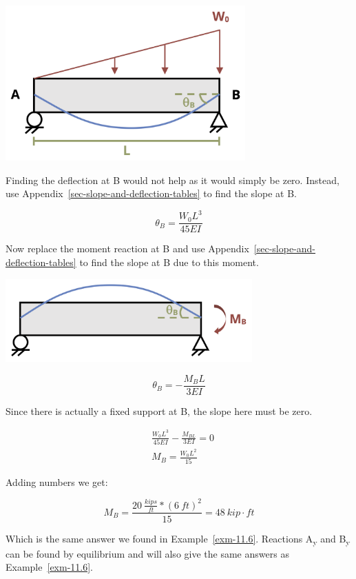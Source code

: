 \documentclass[
  letterpaper,
  DIV=11,
  numbers=noendperiod]{scrreprt}
\theoremstyle{definition}
\theoremstyle{remark}
\begin{document}
\begin{tcolorbox}
\begin{tcolorbox}
\begin{center}
\includegraphics[width=3.625in,height=\textheight]{images/CH11 PNGs/example11.7v2-2.png}
\end{center}

Finding the deflection at B would not help as it would simply be zero.
Instead, use Appendix~\ref{sec-slope-and-deflection-tables} to find the
slope at B.

\[
\theta_B=\frac{W_0 L^3}{45 E I}
\]

Now replace the moment reaction at B and use
Appendix~\ref{sec-slope-and-deflection-tables} to find the slope at B
due to this moment.

\begin{center}
\includegraphics[width=3.72917in,height=\textheight]{images/CH11 PNGs/example11.7v2-3.png}
\end{center}

\[
\theta_B=-\frac{M_B L}{3 E I}
\]

Since there is actually a fixed support at B, the slope here must be
zero.

\[
\begin{aligned} &\frac{W_0 L^3}{45 E I}-\frac{M_{B L}}{3 E I}=0 \\ &M_B  =\frac{W_0 L^2}{15}\end{aligned}
\]

Adding numbers we get:

\[
M_B=\frac{20~\frac{kips}{ft}*(6{~ft})^2}{15}=48{~kip}\cdot{ft}
\]

Which is the same answer we found in Example~\ref{exm-11.6}. Reactions
A\textsubscript{y} and B\textsubscript{y} can be found by equilibrium
and will also give the same answers as Example~\ref{exm-11.6}.


\end{tcolorbox}
\end{tcolorbox}
\end{document}
